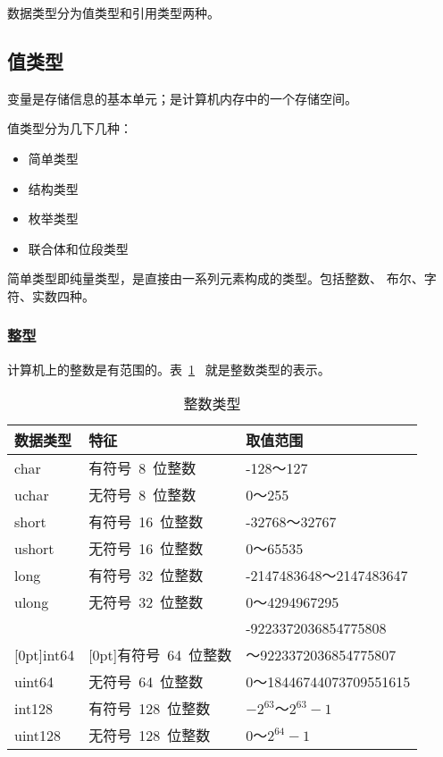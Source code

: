 ﻿%
%

数据类型分为值类型和引用类型两种。

\subsection{值类型}

变量是存储信息的基本单元；是计算机内存中的一个存储空间。

值类型分为几下几种：

\begin{itemize}
\item{简单类型}
\item{结构类型}
\item{枚举类型}
\item{联合体和位段类型}
\end{itemize}

简单类型即纯量类型，是直接由一系列元素构成的类型。包括整数、
布尔、字符、实数四种。

\subsubsection{整型}

计算机上的整数是有范围的。表~\ref{tab_int}~ 就是整数类型的表示。

\begin{table}[h]
  \centering
  \caption{整数类型}\label{tab_int}
  \vspace{1.5ex}
\begin{tabular}{|l|l|l|}
  \hline
  \textbf{数据类型} & \textbf{特征} & \textbf{取值范围} \\
  \hline\hline
  char & 有符号~8~位整数 & -128～127 \\
  \hline
  uchar & 无符号~8~位整数 & 0～255 \\
  \hline
  short & 有符号~16~位整数 & -32768～32767 \\
  \hline
  ushort & 无符号~16~位整数 & 0～65535 \\
  \hline
  long & 有符号~32~位整数 & -2147483648～2147483647 \\
  \hline
  ulong & 无符号~32~位整数 & 0～4294967295 \\
  \hline
   &  & -9223372036854775808 \\
  \raisebox{1.3ex}[0pt]{int64} & \raisebox{1.3ex}[0pt]{有符号~64~位整数}
  & ～9223372036854775807 \\
  \hline
  uint64 & 无符号~64~位整数 & 0～18446744073709551615 \\
  \hline
  int128 & 有符号~128~位整数 & $-2^{63}$～$2^{63}-1$ \\
  \hline
  uint128 & 无符号~128~位整数 & $0$～$2^{64}-1$ \\
  \hline
\end{tabular}

\end{table}

